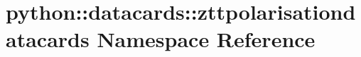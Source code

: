 \hypertarget{namespacepython_1_1datacards_1_1zttpolarisationdatacards}{
\section{python::datacards::zttpolarisationdatacards Namespace Reference}
\label{namespacepython_1_1datacards_1_1zttpolarisationdatacards}
}
